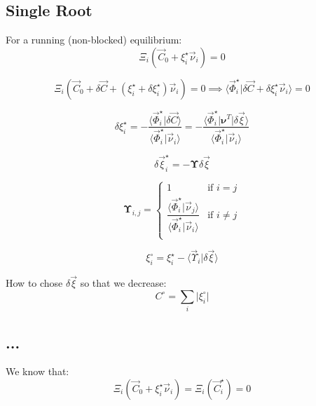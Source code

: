 \documentclass[aps,12pt]{revtex4}
\begin{document}
\subsection{Single Root}

For a running (non-blocked) equilibrium:
\begin{equation}
	\Xi_i(\vec C_0 + \xi_{i}^\star \vec \nu_i ) = 0
\end{equation}

\begin{equation}
	\Xi_i(\vec C_0 + \delta \vec C + (\xi_i^\star + \delta  \xi_i^\star)\vec \nu_i  ) = 0
	\implies
	\langle \vec \Phi_i^\star \vert \delta \vec C +  \delta \xi_i^\star \vec \nu_i \rangle = 0
\end{equation}

\begin{equation}
	 \delta \xi_i^\star = - \dfrac{\langle \vec \Phi_i^\star \vert \delta \vec C \rangle }
	 { \langle \vec \Phi_i^\star \vert \vec \nu_i \rangle  }
	 =
	  - \dfrac{\langle \vec \Phi_i^\star \vert \bm{\nu}^T \vert \delta \vec \xi \rangle }
	 { \langle \vec \Phi_i^\star \vert \vec \nu_i \rangle  }
\end{equation}

\begin{equation}
	\delta \vec \xi_i ^\star = - \bm\Upsilon \delta \vec \xi
\end{equation}

\begin{equation}
	\bm\Upsilon_{i,j} = 
	\left\lbrace
	\begin{array}{rl}
	1 & \text{if } i=j\\
	\dfrac{\langle \vec \Phi_i^\star \vert \vec \nu_j \rangle }{\langle \vec \Phi_i^\star \vert \vec \nu_i \rangle } & \text{if } i\not=j\\
	\end{array}
	\right.
\end{equation}
	
\begin{equation}
	\xi_i ^\circ = \xi_i^\star - \langle \vec\Upsilon_i \vert \delta \vec \xi \rangle
\end{equation}
	
How to chose $\delta \vec \xi$ so that we decrease:
\begin{equation}
	C^\circ = \sum_i \vert \xi_i^\circ \vert 
\end{equation}

\subsection{...}
We know that:
\begin{equation}
	\Xi_i(\vec C_0 + \xi_i^\star \vec \nu _i) = \Xi_i(\vec C_i^\star) = 0
\end{equation}
\end{document}
